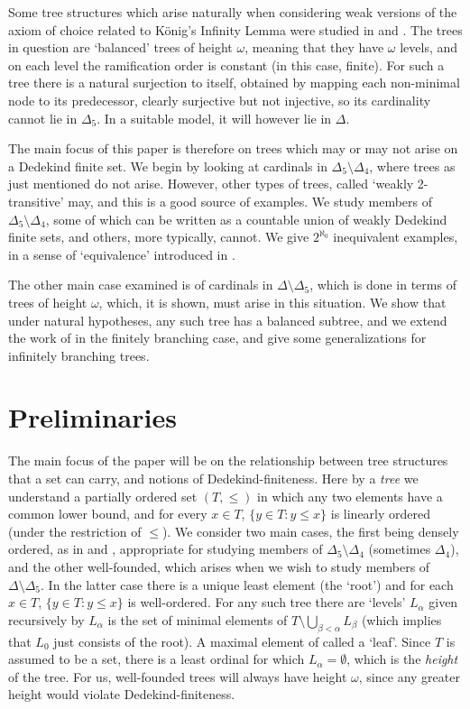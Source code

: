 \documentclass[a4paper,reqno]{amsart}
\numberwithin{equation}{section}
\begin{document}
Some tree structures which arise naturally when considering weak versions of the axiom of choice related
to K\"onig's Infinity Lemma were studied in \cite{Truss2} and \cite{Forster}. The trees in question are
`balanced' trees of height $\omega$, meaning that they have $\omega$ levels, and on each level the 
ramification order is constant (in this case, finite). For such a tree there is a natural surjection
to itself, obtained by mapping each non-minimal node to its predecessor, clearly surjective but not 
injective, so its cardinality cannot lie in $\Delta_5$. In a suitable model, it will however lie in 
$\Delta$. 

The main focus of this paper is therefore on trees which may or may not arise on a Dedekind finite set.
We begin by looking at cardinals in $\Delta_5 \setminus \Delta_4$, where trees as just mentioned do not 
arise. However, other types of trees, called `weakly 2-transitive' may, and this is a good source of
examples. We study members of $\Delta_5 \setminus \Delta_4$, some of which can be written as a 
countable union of weakly Dedekind finite sets, and others, more typically, cannot. We give 
$2^{\aleph_0}$ inequivalent examples, in a sense of `equivalence' introduced in \cite{Truss4}.

The other main case examined is of cardinals in $\Delta \setminus \Delta_5$, which is done in
terms of trees of height $\omega$, which, it is shown, must arise in this situation. We show that under
natural hypotheses, any such tree has a balanced subtree, and we extend the work of \cite{Forster} in 
the finitely branching case, and give some generalizations for infinitely branching trees. 



\section {Preliminaries}

The main focus of the paper will be on the relationship between tree structures that a set can carry, and notions 
of Dedekind-finiteness. Here by a {\em tree} we understand a partially ordered set $(T, \le)$ in which any two 
elements have a common lower bound, and for every $x \in T$, $\{y \in T: y \le x\}$ is linearly ordered (under the 
restriction of $\le$). We consider two main cases, the first being densely ordered, as in \cite{Droste1} and 
\cite{Droste2}, appropriate for studying members of $\Delta_5 \setminus \Delta_4$ (sometimes $\Delta_4$), and 
the other well-founded, which arises when we wish to study members of $\Delta \setminus \Delta_5$.  In the 
latter case there is a unique least element (the `root') and for each $x \in T$, $\{y \in T: y \le x\}$ is 
well-ordered. For any such tree there are `levels' $L_\alpha$ given recursively by $L_\alpha$ is the set of minimal elements of 
$T \setminus \bigcup_{\beta < \alpha}L_\beta$ (which implies that $L_0$ just consists of the root). A maximal 
element of called a `leaf'. Since $T$ is assumed to be a set, there is a least ordinal for which $L_\alpha = \emptyset$, 
which is the {\em height} of the tree. For us, well-founded trees will always have height $\omega$, since any 
greater height would violate Dedekind-finiteness.
\end{document}
